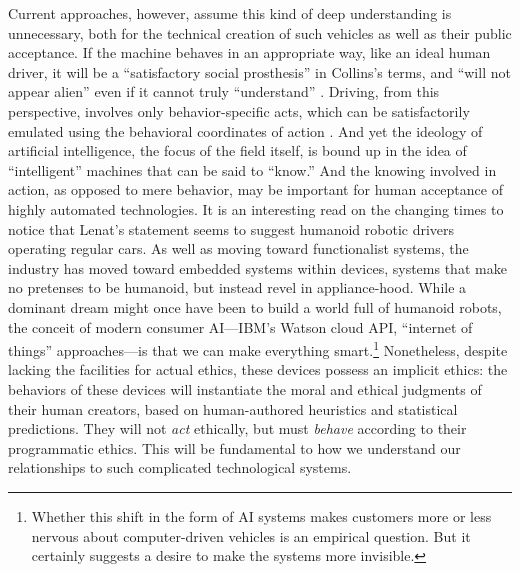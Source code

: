 Current approaches, however, assume this kind of deep understanding is
unnecessary, both for the technical creation of such vehicles as well
as their public acceptance. If the machine behaves in an appropriate
way, like an ideal human driver, it will be a ``satisfactory social
prosthesis'' in Collins's terms, and ``will not appear alien'' even if
it cannot truly ``understand'' \cite[p. 31]{Collins}. Driving, from
this perspective, involves only behavior-specific acts, which can be
satisfactorily emulated using the behavioral coordinates of
action \cite[p. 33--37]{Collins}. And yet the ideology of artificial
intelligence, the focus of the field itself, is bound up in the idea
of ``intelligent'' machines that can be said to ``know.'' And the
knowing involved in action, as opposed to mere behavior, may be
important for human acceptance of highly automated technologies. It is an
interesting read on the changing 
times to notice that Lenat's statement seems to suggest humanoid
robotic drivers operating regular cars. As well as moving toward
functionalist systems, the industry has moved toward embedded systems
within devices, systems that make no pretenses to be humanoid, but
instead revel in appliance-hood. While a dominant dream might once have been
to build a world full of humanoid robots, the conceit of modern
consumer AI---IBM's Watson cloud API, ``internet of things''
approaches---is that we can make everything smart.\footnote{Whether this shift
in the form of AI 
systems makes customers more or less nervous about computer-driven
vehicles is an empirical question. But it certainly suggests a desire
to make the systems more 
invisible.}
Nonetheless, despite lacking the facilities for actual ethics, these
devices possess an implicit ethics: the
behaviors of these devices will instantiate the moral and
ethical judgments of their human creators, based on
human-authored heuristics and statistical predictions. They will not
\emph{act} ethically, but must
\emph{behave} according to their programmatic ethics. This will be
fundamental to how we understand our relationships to such
complicated technological systems.




